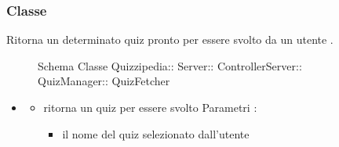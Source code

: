 \subsubsection{Classe }
Ritorna un determinato quiz pronto per essere svolto da un utente .
\begin{figure}[H]
\centering
\noindent{}
\caption[Schema Classe QuizFetcher]{Schema Classe Quizzipedia:: Server:: ControllerServer:: QuizManager:: QuizFetcher}
\end{figure}
\begin{itemize}
\item {}
\begin{itemize}
\item {}
\newline
ritorna un quiz per essere svolto
\newline
Parametri :
\begin{itemize}
\item {}
\newline
il nome del quiz selezionato dall'utente
\end{itemize}
\end{itemize}
\end{itemize}

